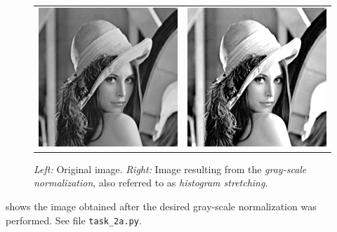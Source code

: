 \documentclass[a4paper,twocolumn]{article}
\begin{document}
	\begin{figure} [t]
		\centering
		\begin{tabular}{c c}
			\includegraphics[width=0.8\columnwidth]{figures/original.png}
			&
			\includegraphics[width=0.8\columnwidth]{figures/normalized.png}
		\end{tabular}
		\caption{\textit{Left:} Original image. \textit{Right:} Image resulting from the \textit{gray-scale normalization}, also referred to as \textit{histogram stretching}.}
		\label{fig:task_2a}
	\end{figure}
	
	 shows the image obtained after the desired gray-scale normalization was performed. See file \texttt{task\_2a.py}.
	
\end{document}
